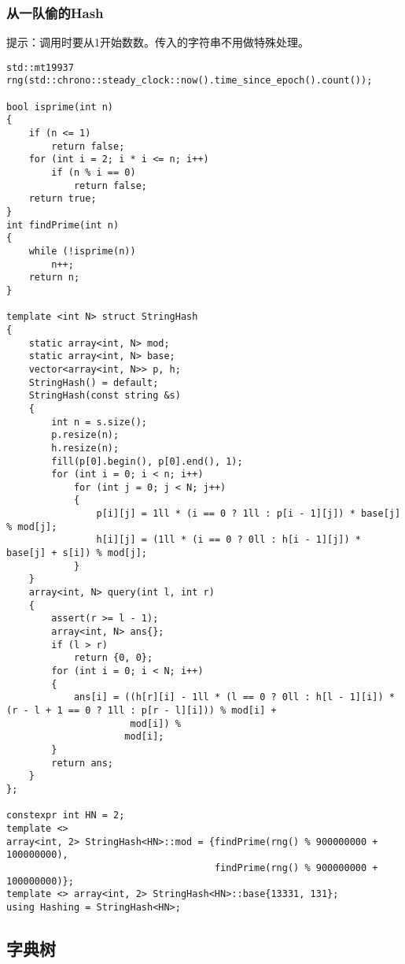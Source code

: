\documentclass[]{article}
\begin{document}
\hypertarget{ux4eceux4e00ux961fux5077ux7684hash}{%
\subsubsection{从一队偷的Hash}\label{ux4eceux4e00ux961fux5077ux7684hash}}

提示：调用时要从1开始数数。传入的字符串不用做特殊处理。

\begin{verbatim}
std::mt19937 rng(std::chrono::steady_clock::now().time_since_epoch().count());

bool isprime(int n)
{
    if (n <= 1)
        return false;
    for (int i = 2; i * i <= n; i++)
        if (n % i == 0)
            return false;
    return true;
}
int findPrime(int n)
{
    while (!isprime(n))
        n++;
    return n;
}

template <int N> struct StringHash
{
    static array<int, N> mod;
    static array<int, N> base;
    vector<array<int, N>> p, h;
    StringHash() = default;
    StringHash(const string &s)
    {
        int n = s.size();
        p.resize(n);
        h.resize(n);
        fill(p[0].begin(), p[0].end(), 1);
        for (int i = 0; i < n; i++)
            for (int j = 0; j < N; j++)
            {
                p[i][j] = 1ll * (i == 0 ? 1ll : p[i - 1][j]) * base[j] % mod[j];
                h[i][j] = (1ll * (i == 0 ? 0ll : h[i - 1][j]) * base[j] + s[i]) % mod[j];
            }
    }
    array<int, N> query(int l, int r)
    {
        assert(r >= l - 1);
        array<int, N> ans{};
        if (l > r)
            return {0, 0};
        for (int i = 0; i < N; i++)
        {
            ans[i] = ((h[r][i] - 1ll * (l == 0 ? 0ll : h[l - 1][i]) * (r - l + 1 == 0 ? 1ll : p[r - l][i])) % mod[i] +
                      mod[i]) %
                     mod[i];
        }
        return ans;
    }
};

constexpr int HN = 2;
template <>
array<int, 2> StringHash<HN>::mod = {findPrime(rng() % 900000000 + 100000000),
                                     findPrime(rng() % 900000000 + 100000000)};
template <> array<int, 2> StringHash<HN>::base{13331, 131};
using Hashing = StringHash<HN>;
\end{verbatim}

\hypertarget{ux5b57ux5178ux6811}{%
\subsection{字典树}\label{ux5b57ux5178ux6811}}
\end{document}
